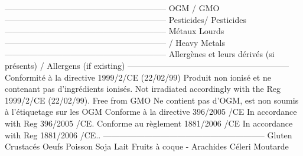 ----------------------------------------------------------- \newline OGM /  GMO \newline ----------------------------------------------------------- \newline Pesticides/  Pesticides \newline ----------------------------------------------------------- \newline Métaux Lourds \newline ----------------------------------------------------------- \newline /  Heavy Metals \newline ----------------------------------------------------------- \newline Allergènes et leurs dérivés (si présents) \newline /  Allergens (if existing) \newline ----------------------------------------------------------- \newline Conformité à la directive 1999/2/CE (22/02/99)  \newline Produit non ionisé et ne contenant pas d’ingrédients ionisés.  \newline Not irradiated  \newline accordingly with the Reg 1999/2/CE (22/02/99). \newline Free from GMO \newline Ne contient pas d’OGM, est non soumis à l’étiquetage sur les OGM  \newline Conforme à la directive 396/2005 /CE  \newline In accordance with Reg 396/2005 /CE. \newline Conforme au règlement 1881/2006 /CE   \newline In accordance with Reg 1881/2006 /CE.. \newline ----------------------------------------------------------- \newline Gluten \newline Crustacés \newline Oeufs \newline Poisson \newline Soja \newline Lait \newline Fruits à coque - Arachides \newline Céleri \newline Moutarde 
